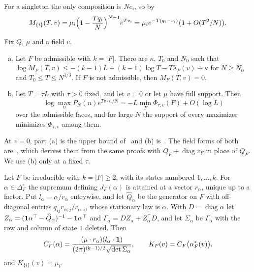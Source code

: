For a singleton the only composition is $Ne_i$, so by~\cite[(1)]{paperC1}
\begin{equation}\label{eq:vertexmax}
 M_{\{i\}}(T,v)=\mu_i\Bigl(1-\frac{Tq_i}N\Bigr)^{N-1}e^{Tv_i}
 =\mu_ie^{-T(q_i-v_i)}\bigl(1+O(T^2/N)\bigr).
\end{equation}

\begin{theorem}\label{thm:first}
Fix $Q$, $\mu$ and a field $v$.
\begin{enumerate}[(a)]
\item Let $F$ be admissible with $k=|F|$. There are $\kappa$, $T_0$ and $N_0$ such that
$\log M_F(T,v)\le-(k-1)L+(k-1)\log T-T\lambda_F(v)+\kappa$ for $N\ge N_0$ and
$T_0\le T\le N^{1/3}$. If $F$ is not admissible, then $M_F(T,v)=0$.
\item Let $T=\tau L$ with $\tau>0$ fixed, and let $v=0$ or let $\mu$ have full support. Then
\[
 \log\max_nP_N(n)e^{Tv\cdot n/N}=-L\min_F\Phi_{\tau,v}(F)+O(\log L)
\]
over the admissible faces, and for large $N$ the support of every maximizer minimizes
$\Phi_{\tau,v}$ among them.
\end{enumerate}
\end{theorem}

At $v=0$, part (a) is the upper bound of~\cite[Theorem~4.2(ii)]{paperC1} and (b)
is~\cite[Theorem~4.2(iii)]{paperC1}. The field forms of both are~\cite[Remark~4.3]{paperC1}, which
derives them from the same proofs with $Q_F+\operatorname{diag}v_F$ in place of $Q_F$. We use (b)
only at a fixed $\tau$.

\begin{definition}\label{def:tilt}
Let $F$ be irreducible with $k=|F|\ge2$, with its states numbered $1,\dots,k$. For $\alpha\in\Delta_F^\circ$ the supremum
defining $J_F(\alpha)$ is attained at a vector $r_\alpha$, unique up to a factor. Put
$l_\alpha=\alpha/r_\alpha$ entrywise, and let $\widehat Q_\alpha$ be the generator on $F$
with off-diagonal entries $q_{ij}r_{\alpha,j}/r_{\alpha,i}$, whose stationary law is
$\alpha$. With $D=\operatorname{diag}\alpha$ let
$Z_\alpha=(\mathbf{1}\alpha^\top-\widehat Q_\alpha)^{-1}-\mathbf{1}\alpha^\top$ and
$\Gamma_\alpha=DZ_\alpha+Z_\alpha^\top D$, and let $\Sigma_\alpha$ be $\Gamma_\alpha$ with
the row and column of state $1$ deleted. Then
\[
 C_F(\alpha)=\frac{(\mu\cdot r_\alpha)(l_\alpha\cdot\mathbf{1})}{(2\pi)^{(k-1)/2}\sqrt{\det\Sigma_\alpha}},
 \qquad K_F(v)=C_F\bigl(\alpha^*_F(v)\bigr),
\]
and $K_{\{i\}}(v)=\mu_i$.
\end{definition}

